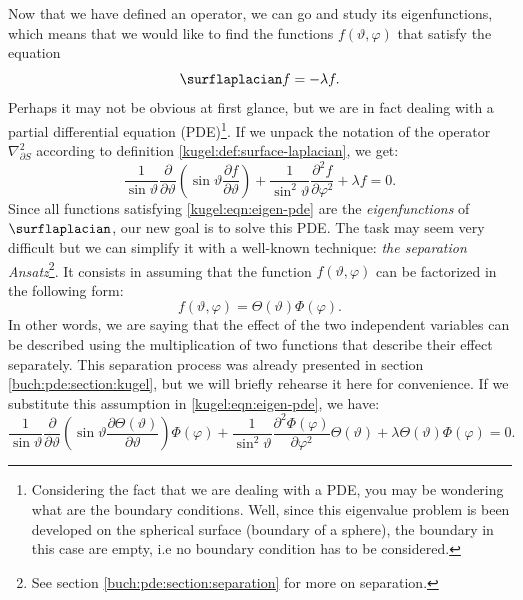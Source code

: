 Now that we have defined an operator, we can go and study its eigenfunctions,
which means that we would like to find the functions $f(\vartheta, \varphi)$
that satisfy the equation
\begin{equation} \label{kugel:eqn:eigen}
    \surflaplacian f = -\lambda f.
\end{equation}
Perhaps it may not be obvious at first glance, but we are in fact dealing with a
partial differential equation (PDE)\footnote{Considering the fact that we are
dealing with a PDE, you may be wondering what are the boundary conditions. Well,
since this eigenvalue problem is been developed on the spherical surface
(boundary of a sphere), the boundary in this case are empty, i.e no boundary
condition has to be considered.}. If we unpack the notation of the operator
$\nabla^2_{\partial S}$ according to definition
\ref{kugel:def:surface-laplacian}, we get:
\begin{equation} \label{kugel:eqn:eigen-pde}
    \frac{1}{\sin\vartheta} \frac{\partial}{\partial \vartheta} \left(
      \sin\vartheta \frac{\partial f}{\partial\vartheta}
    \right)
    + \frac{1}{\sin^2 \vartheta} \frac{\partial^2 f}{\partial\varphi^2}
    + \lambda f = 0.
\end{equation}
Since all functions satisfying \eqref{kugel:eqn:eigen-pde} are the
\emph{eigenfunctions} of $\surflaplacian$, our new goal is to solve this PDE.
The task may seem very difficult but we can simplify it with a well-known
technique: \emph{the separation Ansatz}\footnote{See section
\ref{buch:pde:section:separation} for more on separation.}. It consists in
assuming that the function $f(\vartheta, \varphi)$ can be factorized in the
following form:
\begin{equation}
    f(\vartheta, \varphi) = \Theta(\vartheta)\Phi(\varphi). 
\end{equation}
In other words, we are saying that the effect of the two independent variables
can be described using the multiplication of two functions that describe their
effect separately. This separation process was already presented in section
\ref{buch:pde:section:kugel}, but we will briefly rehearse it here for
convenience. If we substitute this assumption in
\eqref{kugel:eqn:eigen-pde}, we have:
\begin{equation*}
    \frac{1}{\sin\vartheta} \frac{\partial}{\partial \vartheta} \left(
      \sin\vartheta \frac{\partial  \Theta(\vartheta)}{\partial\vartheta}
    \right) \Phi(\varphi)
    + \frac{1}{\sin^2 \vartheta}
      \frac{\partial^2 \Phi(\varphi)}{\partial\varphi^2}
      \Theta(\vartheta)
    + \lambda \Theta(\vartheta)\Phi(\varphi) = 0.
\end{equation*}
